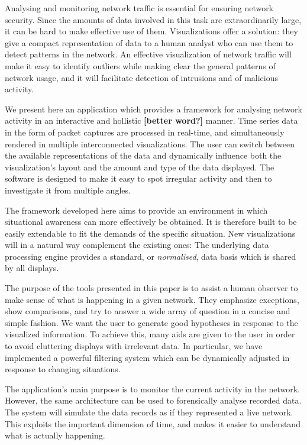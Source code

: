 Analysing and monitoring network traffic is essential for ensuring network security. Since the amounts of data involved in this task are extraordinarily large, it can be hard to make effective use of them. Visualizations offer a solution: they give a compact representation of data to a human analyst who can use them to detect patterns in the network. An effective visualization of network traffic will make it easy to identify outliers while making clear the general patterns of network usage, and it will facilitate detection of intrusions and of malicious activity. 

We present here an application which provides a framework for analysing network activity in an interactive and hollistic \textbf{[better word?]} manner. Time series data in the form of packet captures are processed in real-time, and simultaneously rendered in multiple interconnected visualizations. The user can switch between the available representations of the data and dynamically influence both the visualization's layout and the amount and type of the data displayed. The software is designed to make it easy to spot irregular activity and then to investigate it from multiple angles. 

The framework developed here aims to provide an environment in which situational awareness can more effectively be obtained. It is therefore built to be easily extendable to fit the demands of the specific situation. New visualizations will in a natural way complement the existing ones: The underlying data processing engine provides a standard, or \textit{normalised}, data basis which is shared by all displays.

The purpose of the tools presented in this paper is to assist a human observer to make sense of what is happening in a given network. They emphasize exceptions, show comparisons, and try to answer a wide array of question in a concise and simple fashion. We want the user to generate good hypotheses in response to the visualized information. To achieve this, many aids are given to the user in order to avoid cluttering displays with irrelevant data. In particular, we have implemented a powerful filtering system which can be dynamically adjusted in response to changing situations.

The application's main purpose is to monitor the current activity in the network. However, the same architecture can be used to forensically analyse recorded data. The system will simulate the data records as if they represented a live network. This exploits the important dimension of time, and makes it easier to understand what is actually happening.
